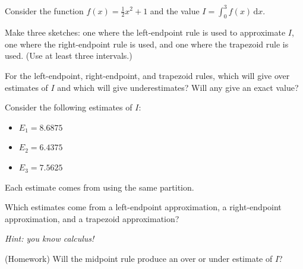 \documentclass{workbook}
\begin{document}
%
%
\begin{slide}
	\question
	Consider the function $f(x)=\frac{1}{2}x^2+1$ and the value $\displaystyle I=\int_{0}^3f(x)\,\mathrm d x$.

	\begin{parts}
		\item Make three sketches: one where the left-endpoint rule is used to approximate $I$,
		one where the right-endpoint rule is used,
		and one where the trapezoid rule is used. (Use at least three intervals.)

		\item For the left-endpoint, right-endpoint, and trapezoid rules, which will give over estimates of
		$I$ and which will give underestimates? Will any give an exact value?

		\medskip
		\item Consider the following estimates of $I$:
		\begin{itemize}
			\item $E_1=8.6875$
			\item $E_2=6.4375$
			\item $E_3=7.5625$
		\end{itemize}
		Each estimate comes from using the same partition.

		Which estimates come from a left-endpoint approximation, a right-endpoint approximation,
		and a trapezoid approximation?

		\emph{Hint: you know calculus!}

		\item (Homework) Will the midpoint rule produce an over or under estimate of $I$?

	\end{parts}
\end{slide}
\end{document}
